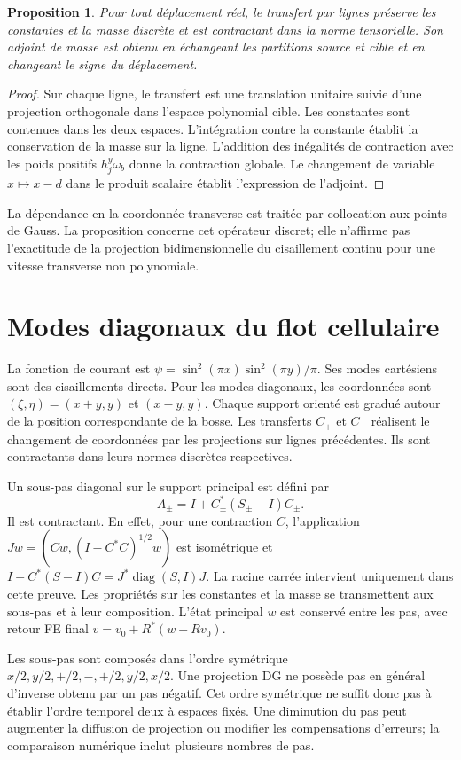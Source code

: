 \documentclass[11pt,a4paper]{article}
\newtheorem{proposition}{Proposition}
\begin{document}
\begin{proposition}
Pour tout déplacement réel, le transfert par lignes préserve les constantes
et la masse discrète et est contractant dans la norme tensorielle.
Son adjoint de masse est obtenu en échangeant les partitions source et cible
et en changeant le signe du déplacement.
\end{proposition}
\begin{proof}
Sur chaque ligne, le transfert est une translation unitaire suivie d'une
projection orthogonale dans l'espace polynomial cible. Les constantes sont
contenues dans les deux espaces. L'intégration contre la constante établit
la conservation de la masse sur la ligne. L'addition des inégalités de
contraction avec les poids positifs $h_j^y\omega_b$ donne la contraction
globale. Le changement de variable $x\mapsto x-d$ dans le produit scalaire
établit l'expression de l'adjoint.
\end{proof}

La dépendance en la coordonnée transverse est traitée par collocation aux
points de Gauss. La proposition concerne cet opérateur discret; elle
n'affirme pas l'exactitude de la projection bidimensionnelle du cisaillement
continu pour une vitesse transverse non polynomiale.

\section{Modes diagonaux du flot cellulaire}
La fonction de courant est $\psi=\sin^2(\pi x)\sin^2(\pi y)/\pi$.
Ses modes cartésiens sont des cisaillements directs. Pour les modes
diagonaux, les coordonnées sont $(\xi,\eta)=(x+y,y)$ et $(x-y,y)$.
Chaque support orienté est gradué autour de la position correspondante de
la bosse. Les transferts $C_+$ et $C_-$ réalisent le changement de
coordonnées par les projections sur lignes précédentes. Ils sont
contractants dans leurs normes discrètes respectives.

Un sous-pas diagonal sur le support principal est défini par
\[
 A_\pm=I+C_\pm^*(S_\pm-I)C_\pm.
\]
Il est contractant. En effet, pour une contraction $C$, l'application
$Jw=(Cw,(I-C^*C)^{1/2}w)$ est isométrique et
$I+C^*(S-I)C=J^*\operatorname{diag}(S,I)J$.
La racine carrée intervient uniquement dans cette preuve. Les propriétés
sur les constantes et la masse se transmettent aux sous-pas et à leur
composition. L'état principal $w$ est conservé entre les pas, avec retour
FE final $v=v_0+R^*(w-Rv_0)$.

Les sous-pas sont composés dans l'ordre symétrique
$x/2,y/2,+/2,-,+/2,y/2,x/2$. Une projection DG ne possède pas en général
d'inverse obtenu par un pas négatif. Cet ordre symétrique ne suffit donc
pas à établir l'ordre temporel deux à espaces fixés. Une diminution du
pas peut augmenter la diffusion de projection ou modifier les compensations
d'erreurs; la comparaison numérique inclut plusieurs nombres de pas.
\end{document}
